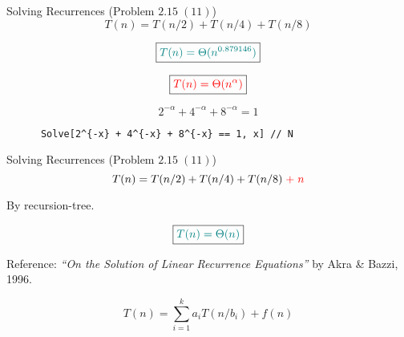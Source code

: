 \begin{frame}[fragile]{}
  \begin{exampleblock}{Solving Recurrences (Problem $2.15\; (11)$)}
    \[
      T(n) = T(n/2) + T(n/4) + T(n/8)
    \]
  \end{exampleblock}

  \pause
  \vspace{0.30cm}
  \[
    \boxed{\textcolor{teal}{T(n) = \Theta(n^{0.879146})}}
  \]

  \pause
  \vspace{0.30cm}
  \[
    \boxed{\textcolor{red}{T(n) = \Theta(n^\alpha)}}
  \]

  \pause
  \vspace{0.30cm}
  \[
    2^{-\alpha} + 4^{-\alpha} + 8^{-\alpha} = 1
  \]

  \pause
  \vspace{0.30cm}
  \begin{center}
    \begin{verbatim}
      Solve[2^{-x} + 4^{-x} + 8^{-x} == 1, x] // N
    \end{verbatim}
  \end{center}
\end{frame}

\begin{frame}{}
  \begin{exampleblock}{Solving Recurrences (Problem $2.15\; (11)$)}
    \[
      T(n) = T(n/2) + T(n/4) + T(n/8) \;\textcolor{red}{+\; n}
    \]
  \end{exampleblock}

  \pause
  \vspace{0.30cm}
  \centerline{By recursion-tree.}
  \pause
  \[
    \boxed{\textcolor{teal}{T(n) = \Theta(n)}}
  \]

  \pause
  \vspace{0.50cm}
  \centerline{}

  \pause
  \begin{alertblock}{Reference:}
    {\it ``On the Solution of Linear Recurrence Equations''} by Akra \& Bazzi, 1996.

    \[
      T(n) = \sum_{i=1}^{k} a_i T(n/b_i) + f(n)
    \]
  \end{alertblock}
\end{frame}

% 
% 
% 
% 
% 

